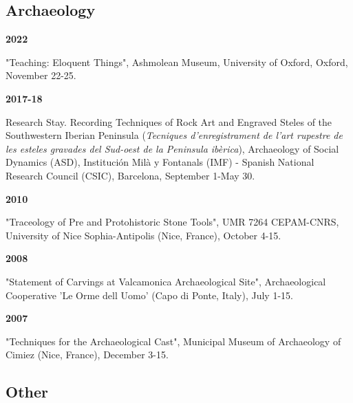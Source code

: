 \documentclass{article}
\newcommand{\fr}[1]{}       %
\newcommand{\en}[1]{#1}     %
\begin{document}
\smallbreak

\subsection*{\fr{Archéologie}\en{Archaeology}}

\textbf{2022 }
\fr{"Teaching: Eloquent Things", Ashmolean Museum, University of Oxford, Oxford, 22-25 Novembre.}
\en{"Teaching: Eloquent Things", Ashmolean Museum, University of Oxford, Oxford, November 22-25.}

\smallbreak
\textbf{2017-18}
\fr{Séjour de recherche. Techniques d'enregistrement de l'art rupestre et des stèles gravées du sud-ouest de la péninsule ibérique (\textit{Tecniques d'enregistrament de l'art rupestre de les esteles gravades del Sud-oest de la Peninsula ibèrica}), Archéologie des Dynamiques Sociales (ASD), Institución Milà y Fontanals (IMF) - Consejo Superior de Investigaciones Científicas (CSIC), Barcelone, 1er septembre-30 mai.}
\en{Research Stay. Recording Techniques of Rock Art and Engraved Steles of the Southwestern Iberian Peninsula (\textit{Tecniques d'enregistrament de l'art rupestre de les esteles gravades del Sud-oest de la Peninsula ibèrica}), Archaeology of Social Dynamics (ASD), Institución Milà y Fontanals (IMF) - Spanish National Research Council (CSIC), Barcelona, September 1-May 30.}

\smallbreak
\textbf{2010 }
\fr{"Tracéologie des outils en pierre pré et protohistoriques", UMR 7264 CEPAM-CNRS, Université Nice Sophia-Antipolis (Nice, France), 4-15 Octobre.}
\en{"Traceology of Pre and Protohistoric Stone Tools", UMR 7264 CEPAM-CNRS, University of Nice Sophia-Antipolis (Nice, France), October 4-15.}

\smallbreak
\textbf{2008 }
\fr{"Statement of carvings in Valcamonica archaeological site", Coopérative archéologique 'Le Orme dell Uomo' (Capo di Ponte, Italy), 1-15 Juillet.}
\en{"Statement of Carvings at Valcamonica Archaeological Site", Archaeological Cooperative 'Le Orme dell Uomo' (Capo di Ponte, Italy), July 1-15.}

\smallbreak
\textbf{2007 }
\fr{"Technics for the archaeological cast", Musée municipal d'archéologie de Cimiez (Nice, France), 3-15 Décembre.}
\en{"Techniques for the Archaeological Cast", Municipal Museum of Archaeology of Cimiez (Nice, France), December 3-15.}

\smallbreak

\subsection*{\fr{Autres}\en{Other}}
\end{document}
